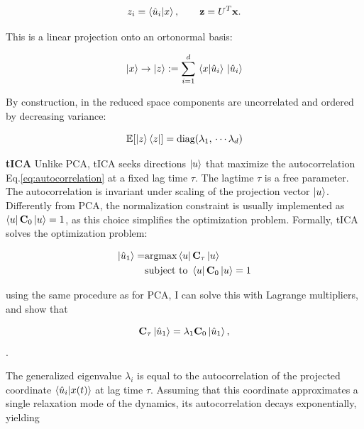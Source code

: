 \begin{equation}
z_i = \braket{\hat{u}_i|x}, \qquad \mathbf z = U^T \mathbf x.
\end{equation}

This is a linear projection onto an ortonormal basis:

\begin{equation*}
    \ket{x} \rightarrow \ket{z} := \sum_{i = 1}^{d}\, \braket{x | \hat{u}_i}\, \ket{\hat{u}_i} 
\end{equation*}

By construction, in the reduced space components are uncorrelated and ordered by decreasing variance:

\begin{equation}
 \mathbb{E}\!\left[\ket{z}\bra{z}\right] = \text{diag}(\lambda_1,\, \cdots \lambda_d)
\end{equation}
\vspace{1em}

\noindent \textbf{tICA} Unlike PCA, tICA \cite{my_tica_ref} seeks directions $\ket{u}$ that maximize the autocorrelation Eq.\eqref{eq:autocorrelation} at a fixed lag time $\tau$. The lagtime $\tau$ is a free parameter.
The autocorrelation is invariant under scaling of the projection vector $\ket{u}$. Differently from PCA, the normalization constraint is usually implemented as $\bra{u}\mathbf{C}_{0}\ket{u}=1$, as this choice simplifies the optimization problem.
Formally, tICA solves the optimization problem:

\begin{align}
    \label{eq:generalized_eigenvalue_problem}
\ket{\hat{u}_1} =& \text{argmax}\bra{u}\mathbf{C}_{\tau}\ket{u} \notag \\
&\text{subject to}  \,\, \bra{u}\mathbf{C}_{0}\ket{u} = 1
\end{align}

using the same procedure as for PCA, I can solve this with Lagrange multipliers, and show that


\begin{equation}
\mathbf{C}_{\tau}\ket{\hat{u}_1}
=
\lambda_1
\mathbf{C}_{0}\ket{\hat{u}_1},
\end{equation}.

The generalized eigenvalue $\lambda_i$ is equal to the autocorrelation of the projected coordinate $\braket{\hat{u}_i|x(t)}$ at lag time $\tau$. Assuming that this coordinate approximates a single relaxation mode of the dynamics, its autocorrelation decays exponentially, yielding

